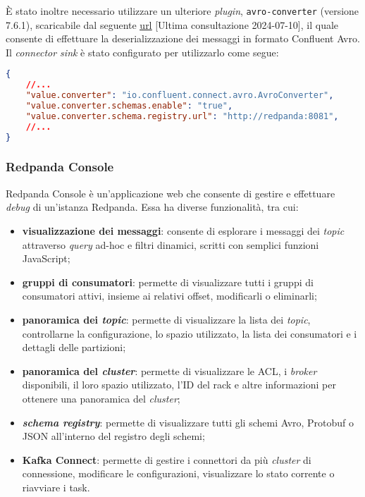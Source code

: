 È stato inoltre necessario utilizzare un ulteriore \textit{plugin}, \texttt{avro-converter} (versione 7.6.1), scaricabile dal seguente
\href{https://www.confluent.io/hub/confluentinc/kafka-connect-avro-converter}{\underline{url}} [Ultima consultazione 2024-07-10],
il quale consente di effettuare la deserializzazione dei messaggi in formato Confluent Avro.\\
Il \textit{connector sink} è stato configurato per utilizzarlo come segue:
\begin{lstlisting}[language=json, caption=Utilizzo del \textit{plugin} \texttt{avro-converter} all'interno del file \texttt{clickhouse.json},captionpos=b]
{
    //...
    "value.converter": "io.confluent.connect.avro.AvroConverter",
    "value.converter.schemas.enable": "true",
    "value.converter.schema.registry.url": "http://redpanda:8081",
    //...
}
\end{lstlisting}

\subsubsection{Redpanda Console}
Redpanda Console è un'applicazione web che consente di gestire e effettuare \textit{debug} di un'istanza Redpanda. Essa ha diverse funzionalità, tra cui:
%
\begin{itemize}
	\item \textbf{visualizzazione dei messaggi}: consente di esplorare i messaggi dei \textit{topic} attraverso \textit{query} ad-hoc e filtri dinamici, scritti con semplici funzioni JavaScript;
	\item \textbf{gruppi di consumatori}: permette di visualizzare tutti i gruppi di consumatori attivi, insieme ai relativi offset, modificarli o eliminarli;
	\item \textbf{panoramica dei \textit{topic}}: permette di visualizzare la lista dei \textit{topic}, controllarne la configurazione, lo spazio utilizzato, la lista dei consumatori e i dettagli delle partizioni;
	\item \textbf{panoramica del \textit{cluster}}: permette di visualizzare le ACL, i \textit{broker} disponibili, il loro spazio utilizzato, l'ID del rack e altre informazioni per ottenere una panoramica del \textit{cluster};
	\item \textbf{\textit{schema registry}}: permette di visualizzare tutti gli schemi Avro, Protobuf o JSON all'interno del registro degli schemi;
	\item \textbf{Kafka Connect}: permette di gestire i connettori da più \textit{cluster} di connessione, modificare le configurazioni, visualizzare lo stato corrente o riavviare i task.
\end{itemize}

